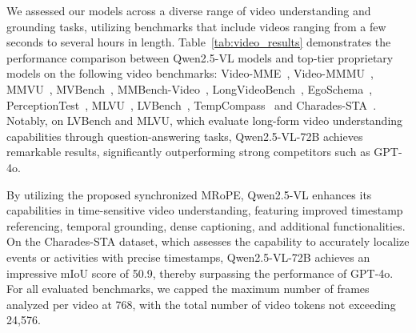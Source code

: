 
We assessed our models across a diverse range of video understanding and grounding tasks, utilizing benchmarks that include videos ranging from a few seconds to several hours in length.
Table~\ref{tab:video_results} demonstrates the performance comparison between Qwen2.5-VL models and top-tier proprietary models on the following video benchmarks: Video-MME~\citep{fu2024video}, Video-MMMU~\citep{hu2025video}, MMVU~\citep{zhao2025mmvu}, MVBench~\citep{li2024mvbench}, MMBench-Video~\citep{fang2024mmbench}, LongVideoBench~\citep{wu2024longvideobench}, EgoSchema~\citep{mangalam2023egoschema}, PerceptionTest~\citep{patraucean2024perception}, MLVU~\citep{zhou2024mlvu}, LVBench~\citep{wang2024lvbench}, TempCompass~\citep{liu2024tempcompass} and Charades-STA~\citep{gao2017tall}.
Notably, on LVBench and MLVU, which evaluate long-form video understanding capabilities through question-answering tasks, Qwen2.5-VL-72B achieves remarkable results, significantly outperforming strong competitors such as GPT-4o.

By utilizing the proposed synchronized MRoPE, Qwen2.5-VL enhances its capabilities in time-sensitive video understanding, featuring improved timestamp referencing, temporal grounding, dense captioning, and additional functionalities. On the Charades-STA dataset, which assesses the capability to accurately localize events or activities with precise timestamps, Qwen2.5-VL-72B achieves an impressive mIoU score of 50.9, thereby surpassing the performance of GPT-4o.
For all evaluated benchmarks, we capped the maximum number of frames analyzed per video at 768, with the total number of video tokens not exceeding 24,576.

